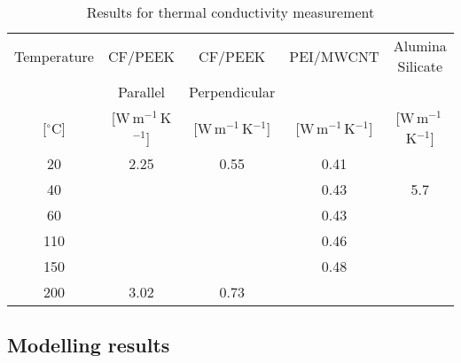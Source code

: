 \begin{table}[ht]
	\centering
	\caption{Results for thermal conductivity measurement}
	\begin{tabular}{@{}ccccc@{}}
		\toprule
		   Temperature    &           CF/PEEK           &           CF/PEEK           &          PEI/MWCNT          &      Alumina Silicate       \\
		                  &          Parallel           &        Perpendicular        &                             &                             \\
		{[}$^{\circ}$C{]} & {[}W\,m$^{-1}$\,K$^{-1}${]} & {[}W\,m$^{-1}$\,K$^{-1}${]} & {[}W\,m$^{-1}$\,K$^{-1}${]} & {[}W\,m$^{-1}$\,K$^{-1}${]} \\ \midrule
		       20         &            2.25             &            0.55             &            0.41             &                             \\
		       40         &                             &                             &            0.43             &             5.7             \\
		       60         &                             &                             &            0.43             &                             \\
		       110        &                             &                             &            0.46             &                             \\
		       150        &                             &                             &            0.48             &                             \\
		       200        &            3.02             &            0.73             &                             &                             \\ \bottomrule
	\end{tabular}
	\label{tab:T2_table2}
\end{table}

\FloatBarrier
\subsection{Modelling results}

